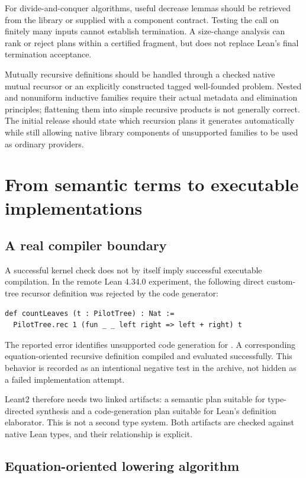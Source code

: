 \documentclass[11pt,a4paper]{article}
\newcommand{\code}[1]{\texttt{\detokenize{#1}}}
\theoremstyle{remark}
\begin{document}
For divide-and-conquer algorithms, useful decrease lemmas should be retrieved from the library or supplied with a component contract. Testing the call on finitely many inputs cannot establish termination. A size-change analysis can rank or reject plans within a certified fragment, but does not replace Lean's final termination acceptance.

Mutually recursive definitions should be handled through a checked native mutual recursor or an explicitly constructed tagged well-founded problem. Nested and nonuniform inductive families require their actual metadata and elimination principles; flattening them into simple recursive products is not generally correct. The initial release should state which recursion plans it generates automatically while still allowing native library components of unsupported families to be used as ordinary providers.

\section{From semantic terms to executable implementations}\label{sec:lowering}

\subsection{A real compiler boundary}

A successful kernel check does not by itself imply successful executable compilation. In the remote Lean 4.34.0 experiment, the following direct custom-tree recursor definition was rejected by the code generator:
\begin{lstlisting}
def countLeaves (t : PilotTree) : Nat :=
  PilotTree.rec 1 (fun _ _ left right => left + right) t
\end{lstlisting}
The reported error identifies unsupported code generation for \code{PilotTree.rec}. A corresponding equation-oriented recursive definition compiled and evaluated successfully. This behavior is recorded as an intentional negative test in the archive, not hidden as a failed implementation attempt.

Leant2 therefore needs two linked artifacts: a semantic plan suitable for type-directed synthesis and a code-generation plan suitable for Lean's definition elaborator. This is not a second type system. Both artifacts are checked against native Lean types, and their relationship is explicit.

\subsection{Equation-oriented lowering algorithm}
\end{document}
